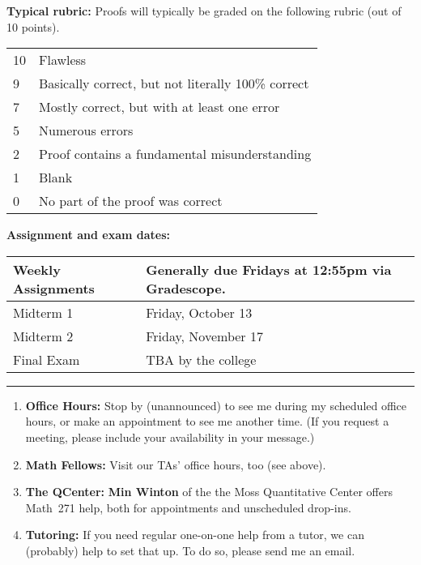 \documentclass[12pt]{article}
\begin{document}
\newpage
\vspace*{.15in}
\noindent\textbf{Typical rubric:} 
Proofs will typically be graded on the following rubric (out of 10 points).

\begin{center}
  \begin{tabular}{|l|l|}
    \hline
    10& Flawless\\
    9& Basically correct, but not literally 100\% correct\\
    7& Mostly correct, but with at least one error\\    
    5& Numerous errors\\
    2& Proof contains a fundamental misunderstanding\\
    1& Blank\\    
    0& No part of the proof was correct\\
    \hline
  \end{tabular}
\end{center}



\noindent\textbf{Assignment and exam dates:}

\begin{center}
  \begin{tabular}{|l|l|}
    \hline
    Weekly Assignments & Generally due Fridays at 12:55pm via Gradescope.\\
    \hline
    Midterm 1  & Friday, October 13 \\
    Midterm 2  & Friday, November 17 \\         
    Final Exam  & TBA by the college	 \\
    \hline
  \end{tabular}
\end{center}


\hrule
\medskip
{}
\begin{enumerate}
\item[]{\bf Office Hours:}  Stop by (unannounced) to see me during my scheduled office hours, or make an appointment to see me another time. (If you request a meeting, please include your availability in your message.)
\item[] {\bf Math Fellows:} Visit our TAs' office hours, too (see above). 
\item[] {\bf The QCenter:}  \textbf{Min Winton} of the the Moss Quantitative Center offers Math~271 help, both for appointments and unscheduled drop-ins.
\item[] {\bf Tutoring:} If you need regular one-on-one help from a tutor, we can (probably) help to set that up. To do so, please send me an email.
\end{enumerate}
\smallskip
\end{document}
